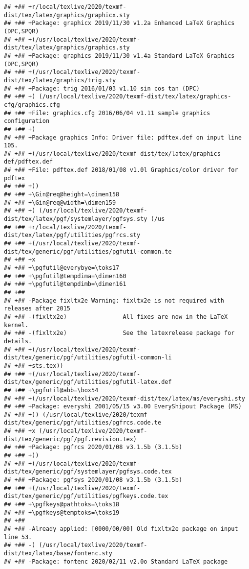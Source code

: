 \documentclass[ignorenonframetext,]{beamer}
\begin{document}
\begin{verbatim}
## +## +r/local/texlive/2020/texmf-dist/tex/latex/graphics/graphicx.sty
## +## +Package: graphicx 2019/11/30 v1.2a Enhanced LaTeX Graphics (DPC,SPQR)
## +## +(/usr/local/texlive/2020/texmf-dist/tex/latex/graphics/graphics.sty
## +## +Package: graphics 2019/11/30 v1.4a Standard LaTeX Graphics (DPC,SPQR)
## +## +(/usr/local/texlive/2020/texmf-dist/tex/latex/graphics/trig.sty
## +## +Package: trig 2016/01/03 v1.10 sin cos tan (DPC)
## +## +) (/usr/local/texlive/2020/texmf-dist/tex/latex/graphics-cfg/graphics.cfg
## +## +File: graphics.cfg 2016/06/04 v1.11 sample graphics configuration
## +## +)
## +## +Package graphics Info: Driver file: pdftex.def on input line 105.
## +## +(/usr/local/texlive/2020/texmf-dist/tex/latex/graphics-def/pdftex.def
## +## +File: pdftex.def 2018/01/08 v1.0l Graphics/color driver for pdftex
## +## +))
## +## +\Gin@req@height=\dimen158
## +## +\Gin@req@width=\dimen159
## +## +) (/usr/local/texlive/2020/texmf-dist/tex/latex/pgf/systemlayer/pgfsys.sty (/us
## +## +r/local/texlive/2020/texmf-dist/tex/latex/pgf/utilities/pgfrcs.sty
## +## +(/usr/local/texlive/2020/texmf-dist/tex/generic/pgf/utilities/pgfutil-common.te
## +## +x
## +## +\pgfutil@everybye=\toks17
## +## +\pgfutil@tempdima=\dimen160
## +## +\pgfutil@tempdimb=\dimen161
## +##  
## +## -Package fixltx2e Warning: fixltx2e is not required with releases after 2015
## +## -(fixltx2e)                All fixes are now in the LaTeX kernel.
## +## -(fixltx2e)                See the latexrelease package for details.
## +## +(/usr/local/texlive/2020/texmf-dist/tex/generic/pgf/utilities/pgfutil-common-li
## +## +sts.tex))
## +## +(/usr/local/texlive/2020/texmf-dist/tex/generic/pgf/utilities/pgfutil-latex.def
## +## +\pgfutil@abb=\box54
## +## +(/usr/local/texlive/2020/texmf-dist/tex/latex/ms/everyshi.sty
## +## +Package: everyshi 2001/05/15 v3.00 EveryShipout Package (MS)
## +## +)) (/usr/local/texlive/2020/texmf-dist/tex/generic/pgf/utilities/pgfrcs.code.te
## +## +x (/usr/local/texlive/2020/texmf-dist/tex/generic/pgf/pgf.revision.tex)
## +## +Package: pgfrcs 2020/01/08 v3.1.5b (3.1.5b)
## +## +))
## +## +(/usr/local/texlive/2020/texmf-dist/tex/generic/pgf/systemlayer/pgfsys.code.tex
## +## +Package: pgfsys 2020/01/08 v3.1.5b (3.1.5b)
## +## +(/usr/local/texlive/2020/texmf-dist/tex/generic/pgf/utilities/pgfkeys.code.tex
## +## +\pgfkeys@pathtoks=\toks18
## +## +\pgfkeys@temptoks=\toks19
## +##  
## +## -Already applied: [0000/00/00] Old fixltx2e package on input line 53.
## +## -) (/usr/local/texlive/2020/texmf-dist/tex/latex/base/fontenc.sty
## +## -Package: fontenc 2020/02/11 v2.0o Standard LaTeX package

\end{verbatim}
\end{document}
